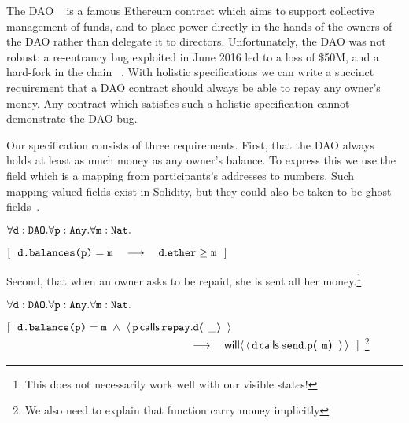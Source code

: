 The DAO ~\cite{Dao}  is a famous Ethereum contract  which aims to support
collective management of funds,  and to place power directly in the
hands of the owners of the DAO
rather than delegate it to directors.
Unfortunately, the DAO was not robust:
a re-entrancy bug   exploited in June 2016 led  to a loss of   \$50M, and
a hard-fork in the  chain ~\cite{DaoBug}.
%
With holistic specifications  we can  write a succinct requirement that a
DAO contract should always be able to repay any owner's money.
Any contract which satisfies such a holistic specification cannot demonstrate the DAO bug.
 
Our specification consists of three requirements.
First, that the DAO always holds at least as 
much money as any owner's balance.  To express this we use 
the field  which is a mapping from participants's addresses to 
numbers. Such mapping-valued fields exist in Solidity, but they could
also be taken to be ghost fields~\cite{ghost}.
 
\vspace{.1cm}

\noindent
 \strut \hspace{0.5cm} $\forall \prg{d}:\prg{DAO}.\forall \prg{p}:\prg{Any}.\forall\prg{m}:\prg{Nat}.$\\
\strut \hspace{0.5cm} $[\ \ \prg{d.balances(p)}=\prg{m}  \ \ \  \longrightarrow  \ \ \ \prg{d}.\prg{ether}\geq \prg{m} \ \ ] $

\noindent
Second, that when an owner asks to be repaid, she is sent all her money.\footnote{This
does not necessarily work well with our visible states!}
\vspace{.1cm}

\noindent
 \strut \hspace{0.5cm} $\forall \prg{d}:\prg{DAO}.\forall \prg{p}:\prg{Any}.\forall\prg{m}:\prg{Nat}.$\\
\strut \hspace{0.5cm} $[\ \ \prg{d.balance(p)}=\prg{m}
 \ \wedge \ \Calls{\prg{p}}{\prg{d}}{\prg{repay}}{\_}  $\\
 $\strut \hspace{5.5cm}   \ \ \  \longrightarrow  \ \ \  \Future{\Calls{\prg{d}}{\prg{p}}{\prg{send}}{\prg{m}}}\ \ ] $ \footnote{We also need to explain that function carry money implicitly}

